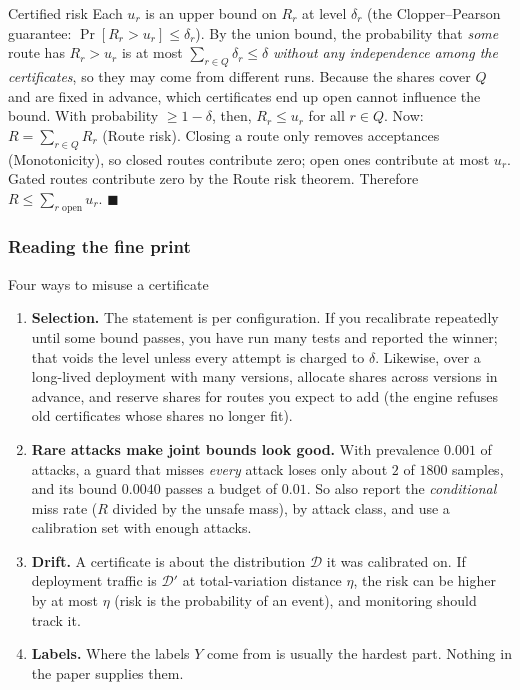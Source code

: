 \begin{plainproof}{Certified risk}
Each $u_r$ is an upper bound on $R_r$ at level $\delta_r$ (the Clopper--Pearson guarantee: $\Pr[R_r>u_r]\le\delta_r$). By the union bound, the probability that \emph{some} route has $R_r>u_r$ is at most $\sum_{r\in Q}\delta_r\le\delta$ \emph{without any independence among the certificates}, so they may come from different runs. Because the shares cover $Q$ and are fixed in advance, which certificates end up open cannot influence the bound. With probability $\ge1-\delta$, then, $R_r\le u_r$ for all $r\in Q$. Now: $R=\sum_{r\in Q}R_r$ (Route risk). Closing a route only removes acceptances (Monotonicity), so closed routes contribute zero; open ones contribute at most $u_r$. Gated routes contribute zero by the Route risk theorem. Therefore $R\le\sum_{r\text{ open}}u_r$. \hfill$\blacksquare$
\end{plainproof}

\subsubsection{Reading the fine print}

\begin{warning}{Four ways to misuse a certificate}
\begin{enumerate}
\item \textbf{Selection.} The statement is per configuration. If you recalibrate repeatedly until some bound passes, you have run many tests and reported the winner; that voids the level unless every attempt is charged to $\delta$. Likewise, over a long-lived deployment with many versions, allocate shares across versions in advance, and reserve shares for routes you expect to add (the engine refuses old certificates whose shares no longer fit).
\item \textbf{Rare attacks make joint bounds look good.} With prevalence $0.001$ of attacks, a guard that misses \emph{every} attack loses only about $2$ of $1800$ samples, and its bound $0.0040$ passes a budget of $0.01$. So also report the \emph{conditional} miss rate ($R$ divided by the unsafe mass), by attack class, and use a calibration set with enough attacks.
\item \textbf{Drift.} A certificate is about the distribution $\mathcal D$ it was calibrated on. If deployment traffic is $\mathcal D'$ at total-variation distance $\eta$, the risk can be higher by at most $\eta$ (risk is the probability of an event), and monitoring should track it.
\item \textbf{Labels.} Where the labels $Y$ come from is usually the hardest part. Nothing in the paper supplies them.
\end{enumerate}
\end{warning}

